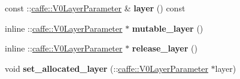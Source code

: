 \begin{DoxyCompactItemize}
const \+::\mbox{\hyperlink{classcaffe_1_1_v0_layer_parameter}{caffe\+::\+V0\+Layer\+Parameter}} \& {\bfseries layer} () const
\item 
\mbox{\label{classcaffe_1_1_v1_layer_parameter_a679516de7dd03d41932e163c674b6b84}} 
inline \+::\mbox{\hyperlink{classcaffe_1_1_v0_layer_parameter}{caffe\+::\+V0\+Layer\+Parameter}} $\ast$ {\bfseries mutable\+\_\+layer} ()
\item 
\mbox{\label{classcaffe_1_1_v1_layer_parameter_ac6d814b45617db9b285fe5f641959e38}} 
inline \+::\mbox{\hyperlink{classcaffe_1_1_v0_layer_parameter}{caffe\+::\+V0\+Layer\+Parameter}} $\ast$ {\bfseries release\+\_\+layer} ()
\item 
\mbox{\label{classcaffe_1_1_v1_layer_parameter_a19a323cb054ffaf55415f2050e6dc20e}} 
void {\bfseries set\+\_\+allocated\+\_\+layer} (\+::\mbox{\hyperlink{classcaffe_1_1_v0_layer_parameter}{caffe\+::\+V0\+Layer\+Parameter}} $\ast$layer)
\end{DoxyCompactItemize}
